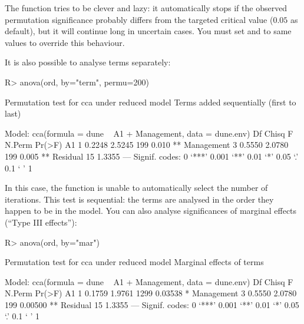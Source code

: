 \documentclass[article,nojss]{jss}
\begin{document}
The  function tries to be clever and lazy: it
automatically stops if the observed permutation significance probably
differs from the targeted critical value ($0.05$ as default), but it
will continue long in uncertain cases.  You must set  and
 to same values to override this behaviour.

It is also possible to analyse terms separately:
\begin{Schunk}
\begin{Sinput}
R> anova(ord, by="term", permu=200)
\end{Sinput}
\begin{Soutput}
Permutation test for cca under reduced model
Terms added sequentially (first to last)

Model: cca(formula = dune ~ A1 + Management, data = dune.env)
           Df  Chisq      F N.Perm Pr(>F)   
A1          1 0.2248 2.5245    199  0.010 **
Management  3 0.5550 2.0780    199  0.005 **
Residual   15 1.3355                        
---
Signif. codes:  0 ‘***’ 0.001 ‘**’ 0.01 ‘*’ 0.05 ‘.’ 0.1 ‘ ’ 1
\end{Soutput}
\end{Schunk}
In this case, the function is unable to automatically select the
number of iterations. This test is sequential: the terms are analysed
in the order they happen to be in the model. You can also analyse
significances of marginal effects (``Type III effects''):
\begin{Schunk}
\begin{Sinput}
R> anova(ord, by="mar")
\end{Sinput}
\begin{Soutput}
Permutation test for cca under reduced model
Marginal effects of terms

Model: cca(formula = dune ~ A1 + Management, data = dune.env)
           Df  Chisq      F N.Perm  Pr(>F)   
A1          1 0.1759 1.9761   1299 0.03538 * 
Management  3 0.5550 2.0780    199 0.00500 **
Residual   15 1.3355                         
---
Signif. codes:  0 ‘***’ 0.001 ‘**’ 0.01 ‘*’ 0.05 ‘.’ 0.1 ‘ ’ 1
\end{Soutput}
\end{Schunk}
\end{document}
